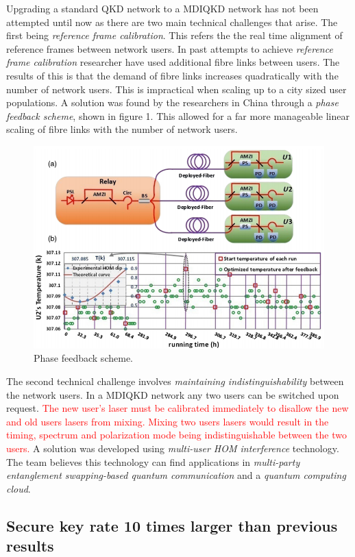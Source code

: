 \documentclass{article}
\begin{document}
\vspace*{1mm}

Upgrading a standard QKD network to a MDIQKD network has not been attempted until now as there are two main technical challenges that arise. The first being \textit{reference frame calibration}. This refers the the real time alignment of reference frames between network users. In past attempts to achieve \textit{reference frame calibration} researcher have used additional fibre links between users. The results of this is that the demand of fibre links increases quadratically with the number of network users. This is impractical when scaling up to a city sized user populations. A solution was found by the researchers in China through a \textit{phase feedback scheme}, shown in figure 1. This allowed for a far more manageable linear scaling of fibre links with the number of network users.

\begin{figure}
  \centering 
  \includegraphics[width=0.7\linewidth]{phase_feedback_scheme.png}
  \caption{Phase feedback scheme\cite{PhysRevX.6.011024}.}
  \label{figure 1}
\end{figure}

The second technical challenge involves \textit{maintaining indistinguishability} between the network users. In a MDIQKD network any two users can be switched upon request. \textcolor{red}{ The new user's laser must be calibrated immediately to disallow the new and old users lasers from mixing. Mixing two users lasers would result in the timing, spectrum and polarization mode being indistinguishable between the two users.} A solution was developed using \textit{multi-user HOM interference} technology. The team believes this technology can find applications in \textit{multi-party entanglement swapping-based quantum communication} and a \textit{quantum computing cloud}.

\subsection*{Secure key rate 10 times larger than previous results}
\end{document}

